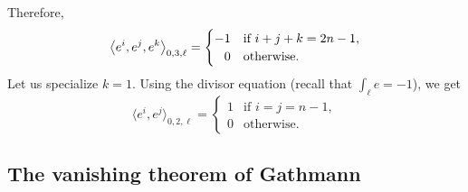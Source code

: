 \documentclass[10pt,a4paper]{article}
\numberwithin{equation}{section}
\begin{document}
Therefore,
\[%
\big\langle e^i,e^j,e^k\big\rangle_{0,3,\ell} =
\begin{cases}
-1 & \mbox{if } i+j+k=2n-1,\\
\hphantom{-}0 & \mbox{otherwise}.
\end{cases}
\]
Let us specialize $k=1$. Using the divisor equation (recall that $\int_\ell e=-1$), we get
\[%
\big\langle e^i,e^j\big\rangle_{0,2,\ell} =
\begin{cases}
1 & \mbox{if } i=j=n-1,\\
0 & \mbox{otherwise}.
\end{cases}
\]

\subsection{The vanishing theorem of Gathmann}
\end{document}
